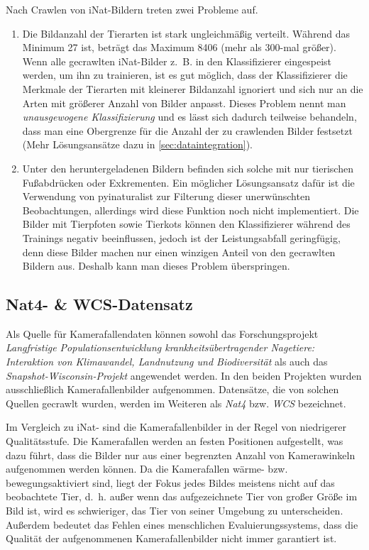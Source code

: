 \begin{enumerate}
\end{enumerate}

Nach Crawlen von iNat-Bildern treten zwei Probleme auf.

\begin{enumerate}
	\item Die Bildanzahl der Tierarten ist stark ungleichmäßig verteilt. Während das Minimum 27 ist, beträgt das Maximum 8406 (mehr als 300-mal größer). Wenn alle gecrawlten iNat-Bilder z.~B. in den Klassifizierer eingespeist werden, um ihn zu trainieren, ist es gut möglich, dass der Klassifizierer die Merkmale der Tierarten mit kleinerer Bildanzahl ignoriert und sich nur an die Arten mit größerer Anzahl von Bilder anpasst. Dieses Problem nennt man \emph{unausgewogene Klassifizierung} und es lässt sich dadurch teilweise behandeln, dass man eine Obergrenze für die Anzahl der zu crawlenden Bilder festsetzt (Mehr Lösungsansätze dazu in \autoref{sec:dataintegration}).
	
	\item Unter den heruntergeladenen Bildern befinden sich solche mit nur tierischen Fußabdrücken oder Exkrementen. Ein möglicher Lösungsansatz dafür ist die Verwendung von pyinaturalist zur Filterung dieser unerwünschten Beobachtungen, allerdings wird diese Funktion noch nicht implementiert. Die Bilder mit Tierpfoten sowie Tierkots können den Klassifizierer während des Trainings negativ beeinflussen, jedoch ist der Leistungsabfall geringfügig, denn diese Bilder machen nur einen winzigen Anteil von den gecrawlten Bildern aus. Deshalb kann man dieses Problem überspringen.
\end{enumerate}

\subsection{Nat4- \& WCS-Datensatz}

Als Quelle für Kamerafallendaten können sowohl das Forschungsprojekt \emph{Langfristige Populationsentwicklung krankheitsübertragender Nagetiere: Interaktion von Klimawandel, Landnutzung und Biodiversität} \cite{imholt2021langfristige} als auch das \emph{Snapshot-Wisconsin-Projekt} angewendet werden. In den beiden Projekten wurden ausschließlich Kamerafallenbilder aufgenommen. Datensätze, die von solchen Quellen gecrawlt wurden, werden im Weiteren als \emph{Nat4} bzw. \emph{WCS} bezeichnet.

Im Vergleich zu iNat- sind die Kamerafallenbilder in der Regel von niedrigerer Qualitätsstufe. Die Kamerafallen werden an festen Positionen aufgestellt, was dazu führt, dass die Bilder nur aus einer begrenzten Anzahl von Kamerawinkeln aufgenommen werden können. Da die Kamerafallen wärme- bzw. bewegungsaktiviert sind, liegt der Fokus jedes Bildes meistens nicht auf das beobachtete Tier, d.~h. außer wenn das aufgezeichnete Tier von großer Größe im Bild ist, wird es schwieriger, das Tier von seiner Umgebung zu unterscheiden. Außerdem bedeutet das Fehlen eines menschlichen Evaluierungssystems, dass die Qualität der aufgenommenen Kamerafallenbilder nicht immer garantiert ist.

